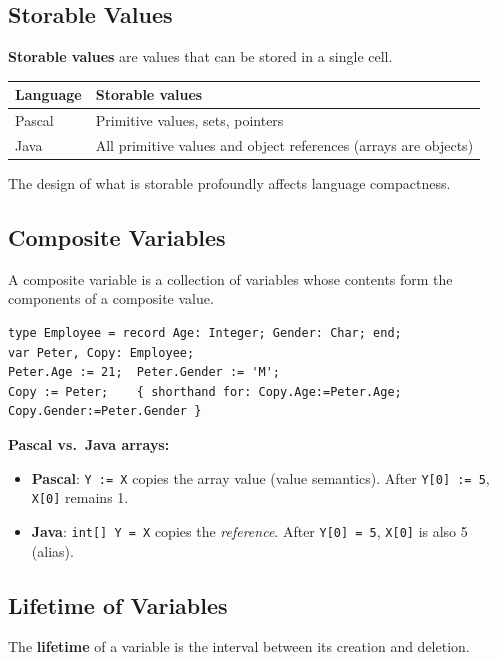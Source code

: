 \documentclass[12pt,a4paper]{article}
\begin{document}
\subsection{Storable Values}

\textbf{Storable values} are values that can be stored in a single cell.

\begin{center}
\begin{tabular}{ll}
\toprule
Language & Storable values\\
\midrule
Pascal & Primitive values, sets, pointers\\
Java   & All primitive values and object references (arrays are objects)\\
\bottomrule
\end{tabular}
\end{center}

The design of what is storable profoundly affects language compactness.

\subsection{Composite Variables}

A composite variable is a collection of variables whose contents form the
components of a composite value.
\begin{lstlisting}[style=pascal,numbers=none]
type Employee = record Age: Integer; Gender: Char; end;
var Peter, Copy: Employee;
Peter.Age := 21;  Peter.Gender := 'M';
Copy := Peter;    { shorthand for: Copy.Age:=Peter.Age; Copy.Gender:=Peter.Gender }
\end{lstlisting}

\textbf{Pascal vs.\ Java arrays:}
\begin{itemize}
  \item \textbf{Pascal}: \texttt{Y := X} copies the array value (value semantics).
        After \texttt{Y[0] := 5}, \texttt{X[0]} remains 1.
  \item \textbf{Java}: \texttt{int[] Y = X} copies the \emph{reference}.
        After \texttt{Y[0] = 5}, \texttt{X[0]} is also 5 (alias).
\end{itemize}

\subsection{Lifetime of Variables}

The \textbf{lifetime} of a variable is the interval between its creation and deletion.
\end{document}
